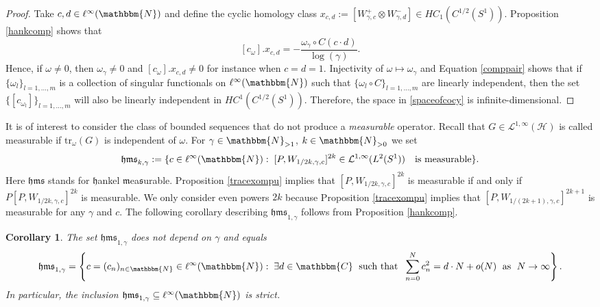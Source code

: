 \documentclass[10pt]{amsart}
\newtheorem{cor}[thm]{Corollary}
\theoremstyle{remark}
\theoremstyle{definition}
\begin{document}
\begin{proof}
Take $c,d\in \ell^\infty({\mathbbm{N}})$ and define the cyclic homology class $x_{c,d}:=[W_{\gamma,c}^+\otimes W_{\gamma,d}^-]\in HC_1(C^{1/2}(S^1))$. Proposition \ref{hankcomp} shows that
\begin{equation}
\label{comppair}
[c_\omega].x_{c,d}=-\frac{\omega_\gamma\circ C(c\cdot d)}{\log(\gamma)}.
\end{equation}
Hence, if $\omega\neq 0$, then $\omega_\gamma\neq 0$ and $[c_\omega].x_{c,d}\neq 0$ for instance when $c=d=1$. Injectivity of $\omega\mapsto \omega_\gamma$ and Equation \eqref{comppair} shows that if $\{\omega_l\}_{l=1,...,m}$ is a collection of singular functionals on $\ell^\infty({\mathbbm{N}})$ such that $\{\omega_{l}\circ C\}_{l=1,...,m}$ are linearly independent, then the set $\{[c_{\omega_l}]\}_{l=1,...,m}$ will also be linearly independent in $HC^1(C^{1/2}(S^1))$. Therefore, the space in \eqref{spaceofcocy} is infinite-dimensional.
\end{proof}

It is of interest to consider the class of bounded sequences that do not produce a \emph{measurable} operator. Recall that $G\in \mathcal{L}^{1,\infty}({\mathcal{H}})$ is called measurable if ${\mathrm{t}\mathrm{r}}_\omega(G)$ is independent of $\omega$. For $\gamma\in {\mathbbm{N}}_{>1}$, $k\in {\mathbbm{N}}_{>0}$ we set
$$\mathfrak{hms}_{k,\gamma}:=\{c\in \ell^\infty({\mathbbm{N}}): \; [P,W_{1/2k,\gamma,c}]^{2k}\in \mathcal{L}^{1,\infty}(L^2(S^1)) \quad \mbox{is measurable}\}.$$
Here $\mathfrak{hms}$ stands for $\mathfrak{h}$ankel $\mathfrak{m}$ea$\mathfrak{s}$urable. Proposition \ref{tracexompu} implies that $[P,W_{1/2k,\gamma,c}]^{2k}$ is measurable if and only if $P[P,W_{1/2k,\gamma,c}]^{2k}$ is measurable. We only consider even powers $2k$ because Proposition \ref{tracexompu} implies that $[P,W_{1/(2k+1),\gamma,c}]^{2k+1}$ is measurable for any $\gamma$ and $c$. The following corollary describing $\mathfrak{hms}_{1,\gamma}$ follows from Proposition \ref{hankcomp}.

\begin{cor}
\label{hermajestyscorollary}
The set $\mathfrak{hms}_{1,\gamma}$ does not depend on $\gamma$ and equals
$$\mathfrak{hms}_{1,\gamma}=\left\{c=(c_n)_{n\in {\mathbbm{N}}}\in \ell^\infty({\mathbbm{N}}): \; \exists d\in {\mathbbm{C}} \;\mbox{ such that }\; \sum_{n=0}^{N} c_n^2=d\cdot N+o(N)\;\mbox{ as }\; N\to \infty\right\}.$$
In particular, the inclusion $\mathfrak{hms}_{1,\gamma}\subseteq \ell^\infty({\mathbbm{N}})$ is strict.
\end{cor}
\end{document}
